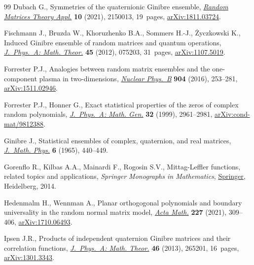 \documentclass[pdftex]{sigma}
\numberwithin{equation}{section}
\newcommand{\1}{\chi}
\begin{document}
\begin{thebibliography}{99}
Dubach G., Symmetries of the quaternionic {G}inibre ensemble, \href{https://doi.org/10.1142/S2010326321500131}{\textit{Random
 Matrices Theory Appl.}} \textbf{10} (2021), 2150013, 19~pages,
 \href{https://arxiv.org/abs/1811.03724}{arXiv:1811.03724}.

Fischmann J., Bruzda W., Khoruzhenko B.A., Sommers H.-J., \.{Z}yczkowski K.,
 Induced {G}inibre ensemble of random matrices and quantum operations,
 \href{https://doi.org/10.1088/1751-8113/45/7/075203}{\textit{J.~Phys.~A: Math. Theor.}} \textbf{45} (2012), 075203, 31~pages,
 \href{https://arxiv.org/abs/1107.5019}{arXiv:1107.5019}.

Forrester P.J., Analogies between random matrix ensembles and the one-component
 plasma in two-dimensions, \href{https://doi.org/10.1016/j.nuclphysb.2016.01.014}{\textit{Nuclear Phys.~B}} \textbf{904} (2016),
 253--281, \href{https://arxiv.org/abs/1511.02946}{arXiv:1511.02946}.

Forrester P.J., Honner G., Exact statistical properties of the zeros of complex
 random polynomials, \href{https://doi.org/10.1088/0305-4470/32/16/006}{\textit{J.~Phys.~A: Math. Gen.}} \textbf{32} (1999),
 2961--2981, \href{https://arxiv.org/abs/cond-mat/9812388}{arXiv:cond-mat/9812388}.

Ginibre J., Statistical ensembles of complex, quaternion, and real matrices,
 \href{https://doi.org/10.1063/1.1704292}{\textit{J.~Math. Phys.}} \textbf{6} (1965), 440--449.

Gorenflo R., Kilbas A.A., Mainardi F., Rogosin S.V., Mittag-{L}effler
 functions, related topics and applications, \textit{Springer Monographs in
 Mathematics}, \href{https://doi.org/10.1007/978-3-662-43930-2}{Springer}, Heidelberg, 2014.

Hedenmalm H., Wennman A., Planar orthogogonal polynomials and boundary
 universality in the random normal matrix model, \href{https://doi.org/10.4310/ACTA.2021.v227.n2.a3}{\textit{Acta Math.}}
 \textbf{227} (2021), 309--406, \href{https://arxiv.org/abs/1710.06493}{arXiv:1710.06493}.

Ipsen J.R., Products of independent quaternion {G}inibre matrices and their
 correlation functions, \href{https://doi.org/10.1088/1751-8113/46/26/265201}{\textit{J.~Phys.~A: Math. Theor.}} \textbf{46} (2013),
 265201, 16~pages, \href{https://arxiv.org/abs/1301.3343}{arXiv:1301.3343}.


\end{thebibliography}
\end{document}
